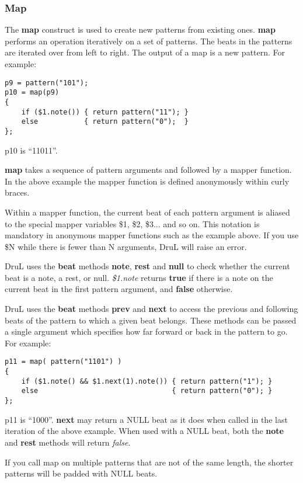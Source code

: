 \subsubsection{Map}\label{MapSection}

The \textbf{map} construct is used to create new patterns from existing ones.
\textbf{map} performs an operation iteratively on a set of patterns.
The beats in the patterns are iterated over from left to right.
The output of a map is a new pattern.  For example:
\begin{verbatim}
p9 = pattern("101");
p10 = map(p9)
{
    if ($1.note()) { return pattern("11"); }
    else           { return pattern("0");  }
};
\end{verbatim}
p10 is ``11011''.

\textbf{map} takes a sequence of pattern arguments and followed by a mapper function.  In the above example the mapper function is defined anonymously within curly braces.

Within a mapper function, the current beat of each pattern argument is aliased to the special mapper variables \$1, \$2, \$3... and so on.  This notation is mandatory in anonymous mapper functions such as the example above. If you use \$N while there is fewer than N arguments, DruL will raise an error.

DruL uses the \textbf{beat} methods \textbf{note}, \textbf{rest} and \textbf{null} to check whether
the current beat is a note, a rest, or null.  
\textit{\$1.note} returns \textbf{true} if there is a note on the current beat in the first pattern argument, and \textbf{false} otherwise.

DruL uses the \textbf{beat} methods \textbf{prev} and \textbf{next} to access the previous and following beats of the pattern to which a given beat belongs. These methods can be passed a single argument which specifies how far forward or back in the pattern to go.  For example:
\begin{verbatim}
p11 = map( pattern("1101") )
{
    if ($1.note() && $1.next(1).note()) { return pattern("1"); }
    else                                { return pattern("0"); }
};
\end{verbatim}
p11 is ``1000''.  \textbf{next} may return a NULL beat as it does when called in the last iteration of the above example.  When used with a NULL beat, both the \textbf{note} and \textbf{rest} methods will return \textit{false}.  

If you call map on multiple patterns that are not of the same length, the shorter patterns will be padded with NULL beats.

